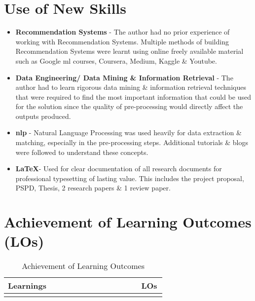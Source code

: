 \section{Use of New Skills}
\begin{itemize}
\item \textbf{Recommendation Systems} - The author had no prior experience of working with Recommendation Systems. Multiple methods of building Recommendation Systems were learnt using online freely available  material such as Google \gls{ml} courses, Coursera, Medium, Kaggle \& Youtube.
\item \textbf{Data Engineering/ Data Mining \& Information Retrieval} - The author had to learn rigorous data mining \& information retrieval techniques that were required to find the most important information that could be used for the solution since the quality of pre-processing would directly affect the outputs produced.
\item \textbf{\gls{nlp}} - Natural Language Processing was used heavily for data extraction \& matching, especially in the pre-processing steps. Additional tutorials \& blogs were followed to understand these concepts.
\item \textbf{\LaTeX }- Used for clear documentation of all research documents for professional typesetting of lasting value. This includes the project proposal, PSPD, Thesis, 2 research papers \& 1 review paper.
\end{itemize}

\section{Achievement of Learning Outcomes (LOs)}

\vspace{-4mm}
\begin{longtable}{|p{0.8\linewidth}|p{0.15\linewidth}|}
\caption{Achievement of Learning Outcomes}\\ 
\hline
\textbf{Learnings} & \textbf{LOs}\endfirsthead 
\hline
 &  \\
\hline
 & \\
\hline
\end{longtable}

